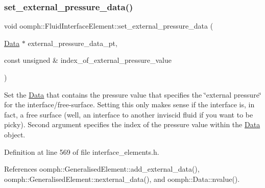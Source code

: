 \mbox{\label{classoomph_1_1FluidInterfaceElement_a87ee1f3227c456a4c30df77c4d0bad6b}} 
\subsubsection{\texorpdfstring{set\+\_\+external\+\_\+pressure\+\_\+data()}{set\_external\_pressure\_data()}\hspace{0.1cm}{\footnotesize\ttfamily [2/2]}}
{\footnotesize\ttfamily void oomph\+::\+Fluid\+Interface\+Element\+::set\+\_\+external\+\_\+pressure\+\_\+data (\begin{DoxyParamCaption}\item[{\hyperlink{classoomph_1_1Data}{Data} $\ast$}]{external\+\_\+pressure\+\_\+data\+\_\+pt,  }\item[{const unsigned \&}]{index\+\_\+of\+\_\+external\+\_\+pressure\+\_\+value }\end{DoxyParamCaption})\hspace{0.3cm}{\ttfamily [inline]}}



Set the \hyperlink{classoomph_1_1Data}{Data} that contains the pressure value that specifies the \char`\"{}external pressure\char`\"{} for the interface/free-\/surface. Setting this only makes sense if the interface is, in fact, a free surface (well, an interface to another inviscid fluid if you want to be picky). Second argument specifies the index of the pressure value within the \hyperlink{classoomph_1_1Data}{Data} object. 



Definition at line 569 of file interface\+\_\+elements.\+h.



References oomph\+::\+Generalised\+Element\+::add\+\_\+external\+\_\+data(), oomph\+::\+Generalised\+Element\+::nexternal\+\_\+data(), and oomph\+::\+Data\+::nvalue().

\mbox{\label{classoomph_1_1FluidInterfaceElement_a7e5c3ca1eba5d4dd44c0eab9be252c2a}} 
